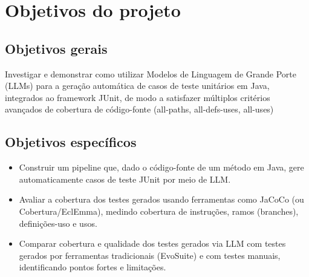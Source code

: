 \section{Objetivos do projeto}
\subsection{Objetivos gerais}
    Investigar e demonstrar como utilizar Modelos de Linguagem de Grande Porte (LLMs) para a geração automática de casos de teste unitários em Java, integrados ao framework JUnit, de modo a satisfazer múltiplos critérios avançados de cobertura de código-fonte (all-paths, all-defs-uses, all-uses)

\subsection{Objetivos específicos}

\begin{itemize}
    \item Construir um pipeline que, dado o código-fonte de um método em Java, gere automaticamente casos de teste JUnit por meio de LLM.
    \item Avaliar a cobertura dos testes gerados usando ferramentas como JaCoCo (ou Cobertura/EclEmma), medindo cobertura de instruções, ramos (branches), definições-uso e usos.
    \item Comparar cobertura e qualidade dos testes gerados via LLM com testes gerados por ferramentas tradicionais (EvoSuite) e com testes manuais, identificando pontos fortes e limitações.
\end{itemize}